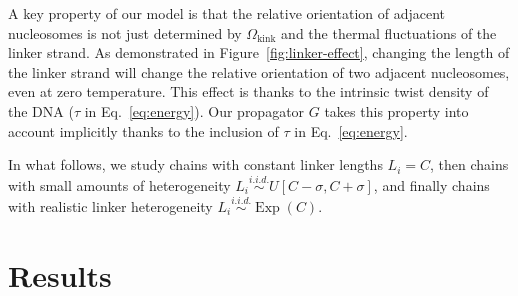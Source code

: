 \documentclass[%
 reprint,
superscriptaddress,
showpacs,preprintnumbers,
 amsmath,amssymb,
 aps,
 prl,
]{revtex4-1}
\begin{document}
A key property of our model is that the relative orientation of adjacent
    nucleosomes is not just determined by $\Omega_\text{kink}$ and the thermal
    fluctuations of the linker strand.
As demonstrated in Figure~\ref{fig:linker-effect}, changing the length of the
    linker strand will change the relative orientation of two adjacent
    nucleosomes, even at zero temperature.
This effect is thanks to the intrinsic twist density of the DNA
    ($\tau$ in Eq.~\ref{eq:energy}).
Our propagator $G$ takes this property into account implicitly thanks to the
    inclusion of $\tau$ in Eq.~\ref{eq:energy}.

In what follows, we study chains with constant linker lengths $L_i = C$, then
chains with small amounts of heterogeneity ${L_i \stackrel{i.i.d.}\sim
U[C - \sigma, C + \sigma]}$, and finally chains with realistic linker
heterogeneity $L_i \stackrel{i.i.d.}\sim \operatorname{Exp}(C)$.



\begin{figure*}[th]
    \begin{centering}
    \end{centering}
    \caption{\protect{} Zero-temperature structure vs. Monte Carlo simulation
    snapshot of nucleosome chain with \SI{38}{\basepair} linkers.
    \protect{} The Kuhn lengths of homogenous chains are
    \SI{10.5}{\basepair} periodic in linker length, with each linker length
    representing a distinct, discretized helical WLC\@. In the limit of long
    linkers, the Kuhn length eventually approaches that of bare DNA,
    \SI{100}{\nano\metre}. \protect{} Compact, superhelical
    structures afford more flexibility than non-compact fibres, which have
    higher Kuhn lengths. Thus, the overall structure of chromatin is extremely
    sensitive to changes in the nucleosome repeat length.}\label{fig:homo-kuhn}
\end{figure*}

\section{\label{sec:model}Results}
\end{document}
